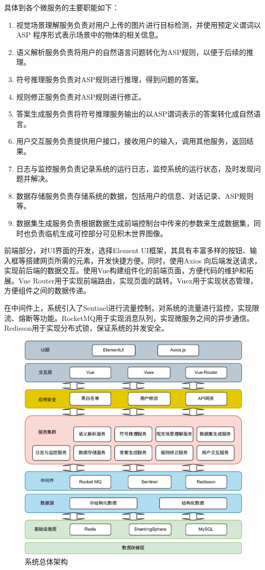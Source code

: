 具体到各个微服务的主要职能如下：
\begin{enumerate}[nosep]
\item 视觉场景理解服务负责对用户上传的图片进行目标检测，并使用预定义谓词以 ASP 程序形式表示场景中的物体的相关信息。
\item 语义解析服务负责将用户的自然语言问题转化为ASP规则，以便于后续的推理。
\item 符号推理服务负责对ASP规则进行推理，得到问题的答案。
\item 规则修正服务负责对ASP规则进行修正。
\item 答案生成服务负责将符号推理服务输出的以ASP谓词表示的答案转化成自然语言。
\item 用户交互服务负责提供用户接口，接收用户的输入，调用其他服务，返回结果。
\item 日志与监控服务负责记录系统的运行日志，监控系统的运行状态，及时发现问题并解决。
\item 数据存储服务负责存储系统的数据，包括用户的信息、对话记录、ASP规则等。
\item 数据集生成服务负责根据数据生成前端控制台中传来的参数来生成数据集，同时也负责临机生成可控部分可见积木世界图像。
\end{enumerate}

前端部分，对UI界面的开发，选择Element UI框架，其具有丰富多样的按钮、输入框等搭建网页所需的元素，开发快捷方便。同时，使用Axios
向后端发送请求，实现前后端的数据交互。使用Vue构建组件化的前端页面，方便代码的维护和拓展。Vue Router用于实现前端路由，实现页面的跳转。Vuex用于实现状态管理，方便组件之间的数据传递。

在中间件上，系统引入了Sentinel进行流量控制，对系统的流量进行监控，实现限流、熔断等功能。RocketMQ用于实现消息队列，实现微服务之间的异步通信。
Redisson用于实现分布式锁，保证系统的并发安全。
\begin{figure}[h]
    \centering
    \includegraphics[scale=0.9]{figures/system_architecture-crop.pdf}
    \caption{系统总体架构}
    \label{fig:overall_architecture}
\end{figure}
